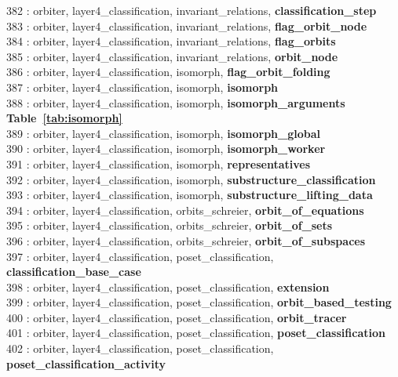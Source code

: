 382 : orbiter, layer4\_classification, invariant\_relations, {\bf classification\_step}\\
383 : orbiter, layer4\_classification, invariant\_relations, {\bf flag\_orbit\_node}\\
384 : orbiter, layer4\_classification, invariant\_relations, {\bf flag\_orbits}\\
385 : orbiter, layer4\_classification, invariant\_relations, {\bf orbit\_node}\\
386 : orbiter, layer4\_classification, isomorph, {\bf flag\_orbit\_folding}\\
387 : orbiter, layer4\_classification, isomorph, {\bf isomorph}\\
388 : orbiter, layer4\_classification, isomorph, {\bf isomorph\_arguments Table~\ref{tab:isomorph}}\\
389 : orbiter, layer4\_classification, isomorph, {\bf isomorph\_global}\\
390 : orbiter, layer4\_classification, isomorph, {\bf isomorph\_worker}\\
391 : orbiter, layer4\_classification, isomorph, {\bf representatives}\\
392 : orbiter, layer4\_classification, isomorph, {\bf substructure\_classification}\\
393 : orbiter, layer4\_classification, isomorph, {\bf substructure\_lifting\_data}\\
394 : orbiter, layer4\_classification, orbits\_schreier, {\bf orbit\_of\_equations}\\
395 : orbiter, layer4\_classification, orbits\_schreier, {\bf orbit\_of\_sets}\\
396 : orbiter, layer4\_classification, orbits\_schreier, {\bf orbit\_of\_subspaces}\\
397 : orbiter, layer4\_classification, poset\_classification, {\bf classification\_base\_case}\\
398 : orbiter, layer4\_classification, poset\_classification, {\bf extension}\\
399 : orbiter, layer4\_classification, poset\_classification, {\bf orbit\_based\_testing}\\
400 : orbiter, layer4\_classification, poset\_classification, {\bf orbit\_tracer}\\
401 : orbiter, layer4\_classification, poset\_classification, {\bf poset\_classification}\\
402 : orbiter, layer4\_classification, poset\_classification, {\bf poset\_classification\_activity}\\
